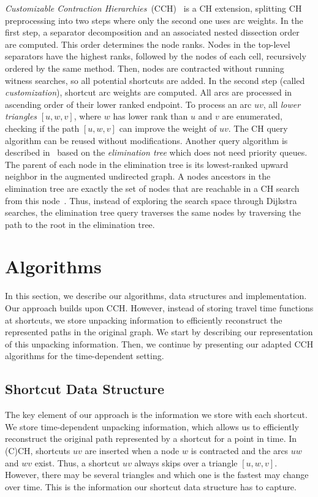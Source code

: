 \documentclass[a4paper,UKenglish,cleveref,autoref]{lipics-v2019}
\begin{document}
\emph{Customizable Contraction Hierarchies}~(CCH)~\cite{dsw-cch-15} is a CH extension, splitting CH preprocessing into two steps where only the second one uses arc weights.
In the first step, a separator decomposition and an associated nested dissection order \cite{bcrw-s-16,g-ndrfe-73} are computed.
This order determines the node ranks.
Nodes in the top-level separators have the highest ranks, followed by the nodes of each cell, recursively ordered by the same method.
Then, nodes are contracted without running witness searches, so all potential shortcuts are added.
In the second step (called \emph{customization}), shortcut arc weights are computed.
All arcs are processed in ascending order of their lower ranked endpoint.
To process an arc $uv$, all \emph{lower triangles} $[u,w,v]$, where $w$ has lower rank than $u$ and $v$ are enumerated, checking if the path $[u,w,v]$ can improve the weight of $uv$.
The CH query algorithm can be reused without modifications.
Another query algorithm is described in~\cite{dsw-cch-15} based on the \emph{elimination tree} which does not need priority queues.
The parent of each node in the elimination tree is its lowest-ranked upward neighbor in the augmented undirected graph.
A nodes ancestors in the elimination tree are exactly the set of nodes that are reachable in a CH search from this node~\cite{bcrw-s-16}.
Thus, instead of exploring the search space through Dijkstra searches, the elimination tree query traverses the same nodes by traversing the path to the root in the elimination tree.

\section{Algorithms}\label{sec:algos}

In this section, we describe our algorithms, data structures and implementation.
Our approach builds upon CCH.
However, instead of storing travel time functions at shortcuts, we store unpacking information to efficiently reconstruct the represented paths in the original graph.
We start by describing our representation of this unpacking information.
Then, we continue by presenting our adapted CCH algorithms for the time-dependent setting.

\subsection{Shortcut Data Structure}\label{sec:shortcut}

The key element of our approach is the information we store with each shortcut.
We store time-dependent unpacking information, which allows us to efficiently reconstruct the original path represented by a shortcut for a point in time.
In (C)CH, shortcuts $uv$ are inserted when a node $w$ is contracted and the arcs $uw$ and $wv$ exist.
Thus, a shortcut $uv$ always skips over a triangle $[u,w,v]$.
However, there may be several triangles and which one is the fastest may change over time.
This is the information our shortcut data structure has to capture.
\end{document}
